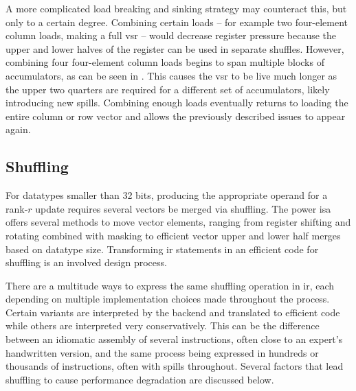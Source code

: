 \documentclass[\main/thesis.tex]{subfiles}
\begin{document}
A more complicated load breaking and sinking strategy may counteract this, but only to a certain degree.
Combining certain loads -- for example two four-element  column loads, making a full \gls{vsr} -- would decrease register pressure because the upper and lower halves of the register can be used in separate shuffles.
However, combining four four-element  column loads begins to span multiple blocks of accumulators, as can be seen in .
This causes the \gls{vsr} to be \gls{live} much longer as the upper two quarters are required for a different set of accumulators, likely introducing new spills.
Combining enough loads eventually returns to loading the entire column or row vector and allows the previously described issues to appear again.

\subsection{Shuffling}
For datatypes smaller than 32 bits, producing the appropriate operand for a rank-$r$ update requires several vectors be merged via shuffling.
The \gls{power} \gls{isa} offers several methods to move vector elements, ranging from register shifting and rotating combined with masking to efficient vector upper and lower half merges based on datatype size.
Transforming \gls{ir} statements in an efficient code for shuffling is an involved design process.

There are a multitude ways to express the same shuffling operation in \gls{ir}, each depending on multiple implementation choices made throughout the process.
Certain variants are interpreted by the backend and translated to efficient code while others are interpreted very conservatively.
This can be the difference between an idiomatic assembly of several instructions, often close to an expert's handwritten version, and the same process being expressed in hundreds or thousands of instructions, often with \glspl{spill} throughout.
Several factors that lead shuffling to cause performance degradation are discussed below.
\end{document}
